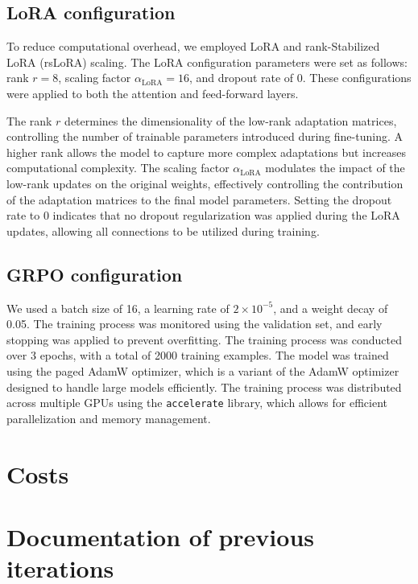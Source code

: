 \subsection{LoRA configuration} \label{app:lora-config}

To reduce computational overhead, we employed LoRA \citep{huLoRALowRankAdaptation2021} and rank-Stabilized LoRA (rsLoRA) scaling. The LoRA configuration parameters were set as follows: rank \( r = 8 \), scaling factor \( \alpha_{\text{LoRA}} = 16 \), and dropout rate of 0. These configurations were applied to both the attention and feed-forward layers.

The rank \( r \) determines the dimensionality of the low-rank adaptation matrices, controlling the number of trainable parameters introduced during fine-tuning. A higher rank allows the model to capture more complex adaptations but increases computational complexity. The scaling factor \( \alpha_{\text{LoRA}} \) modulates the impact of the low-rank updates on the original weights, effectively controlling the contribution of the adaptation matrices to the final model parameters. Setting the dropout rate to 0 indicates that no dropout regularization was applied during the LoRA updates, allowing all connections to be utilized during training.


\subsection{GRPO configuration} \label{app:grpo-config}

We used a batch size of 16, a learning rate of \(2 \times 10^{-5}\), and a weight decay of 0.05. The training process was monitored using the validation set, and early stopping was applied to prevent overfitting. The training process was conducted over 3 epochs, with a total of 2000 training examples. The model was trained using the paged AdamW optimizer, which is a variant of the AdamW optimizer designed to handle large models efficiently. The training process was distributed across multiple GPUs using the \verb|accelerate| library, which allows for efficient parallelization and memory management.
\section{Costs} \label{app:cost}

\section{Documentation of previous iterations} \label{app:previous-iterations}
